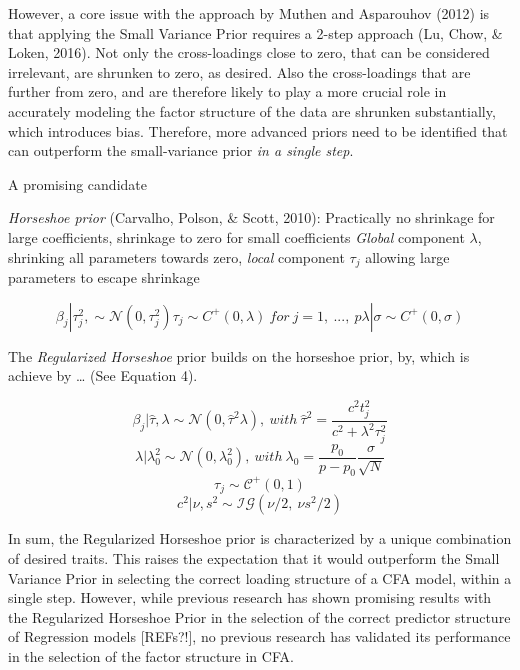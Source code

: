 \documentclass[
  english,
  man]{apa6}
\begin{document}
However, a core issue with the approach by Muthen and Asparouhov (2012) is that applying the Small Variance Prior requires a 2-step approach (Lu, Chow, \& Loken, 2016). Not only the cross-loadings close to zero, that can be considered irrelevant, are shrunken to zero, as desired. Also the cross-loadings that are further from zero, and are therefore likely to play a more crucial role in accurately modeling the factor structure of the data are shrunken substantially, which introduces bias. Therefore, more advanced priors need to be identified that can outperform the small-variance prior \emph{in a single step}.

A promising candidate

\emph{Horseshoe prior} (Carvalho, Polson, \& Scott, 2010):
Practically no shrinkage for large coefficients, shrinkage to zero for small coefficients
\emph{Global} component \(\lambda\), shrinking all parameters towards zero, \emph{local} component \(\tau_j\) allowing large parameters to escape shrinkage

\begin{equation} 
  \beta_j | \tau^2_j, \sim \mathcal{N}(0, \tau^2_j )  
  
  \tau_j \sim C^+(0, \lambda) \ for \ j = 1, \ ..., \ p  
  
  \lambda| \sigma \sim C^+(0, \sigma) 
\end{equation}

The \emph{Regularized Horseshoe} prior builds on the horseshoe prior, by, which is achieve by \ldots{} (See Equation 4).

\[\beta_j | \hat{\tau}, \lambda \sim \mathcal{N}(0, \hat{\tau}^2 \lambda), \ with \ \hat{\tau}^2 = \frac{c^2t_j^2}{c^2 + \lambda^2 \tau_j^2} \]
\[\lambda | \lambda_0^2 \sim \mathcal{N}(0, \lambda_0^2), \ with \  \lambda_0 = \frac{p_0}{p-p_0}\frac{\sigma}{\sqrt{N}}\]
\[\tau_j \sim \mathcal{C^+}(0, 1)\]
\[c^2 | \nu, s^2 \sim \mathcal{IG}(\nu/2, \  \nu s^2/2)\]

In sum, the Regularized Horseshoe prior is characterized by a unique combination of desired traits. This raises the expectation that it would outperform the Small Variance Prior in selecting the correct loading structure of a CFA model, within a single step. However, while previous research has shown promising results with the Regularized Horseshoe Prior in the selection of the correct predictor structure of Regression models {[}REFs?!{]}, no previous research has validated its performance in the selection of the factor structure in CFA.
\end{document}
